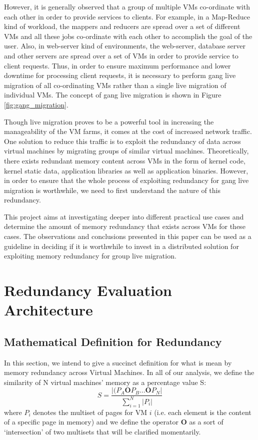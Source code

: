 \documentclass{acm_proc_article-sp}
\begin{document}
However, it is generally observed that a group of multiple VMs co-ordinate with each other in order to provide services to clients. For example, in a Map-Reduce kind of workload, the mappers and reducers are spread over a set of different VMs and all these jobs co-ordinate with each other to accomplish the goal of the user. Also, in web-server kind of environments, the web-server, database server and other servers are spread over a set of VMs in order to provide service to client requests. Thus, in order to ensure maximum performance and lower downtime for processing client requests, it is necessary to perform gang live migration of all co-ordinating VMs rather than a single live migration of individual VMs. The concept of gang live migration is shown in Figure \ref{fig:gang_migration}.
\par
Though live migration proves to be a powerful tool in increasing the manageability of the VM farms, it comes at the cost of increased network traffic. One solution to reduce this traffic is to exploit the redundancy of data across virtual machines by migrating groups of similar virtual machines. Theoretically, there exists redundant memory content across VMs in the form of kernel code, kernel static data, application libraries as well as application binaries. However, in order to ensure that the whole process of exploiting redundancy for gang live migration is worthwhile, we need to first understand the nature of this redundancy.
\par
This project aims at investigating deeper into different practical use cases and determine the amount of memory redundancy that exists across VMs for these cases. The observations and conclusions presented in this paper can be used as a guideline in deciding if it is worthwhile to invest in a distributed solution for exploiting memory redundancy for group live migration.
\par

\section{Redundancy Evaluation Architecture}\label{sec:redundancy}

\subsection{Mathematical Definition for Redundancy}\label{sec:red_math}
In this section, we intend to give a succinct definition for what is mean by memory redundancy across Virtual Machines.  In all of our analysis, we define the similarity of N virtual machines' memory as a percentage value S:
\begin{equation}
S = \frac{|(P_A \mathbf{O} P_B ... \mathbf{O} P_N|}{\sum\limits_{i=1}^{N}|P_i|}
\end{equation}\label{eqn:s}
where $P_i$ denotes the multiset of pages for VM $i$ (i.e. each element is the content of a specific page in memory) and we define the operator $\mathbf{O}$ as a sort of `intersection' of two multisets that will be clarified momentarily.  
\end{document}
